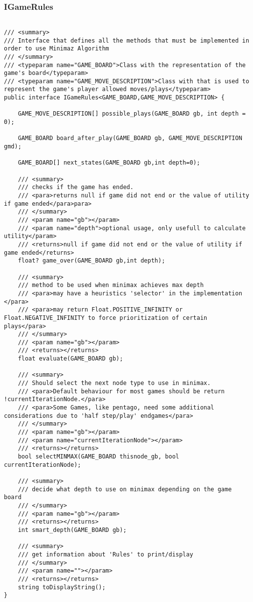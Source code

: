 \subsubsection{IGameRules}
\label{IGameRules}

\begin{lstlisting}

/// <summary>
/// Interface that defines all the methods that must be implemented in order to use Minimaz Algorithm
/// </summary>
/// <typeparam name="GAME_BOARD">Class with the representation of the game's board</typeparam>
/// <typeparam name="GAME_MOVE_DESCRIPTION">Class with that is used to represent the game's player allowed moves/plays</typeparam>
public interface IGameRules<GAME_BOARD,GAME_MOVE_DESCRIPTION> { 
	
	GAME_MOVE_DESCRIPTION[] possible_plays(GAME_BOARD gb, int depth = 0);
	
	GAME_BOARD board_after_play(GAME_BOARD gb, GAME_MOVE_DESCRIPTION gmd);

	GAME_BOARD[] next_states(GAME_BOARD gb,int depth=0);

    /// <summary>
    /// checks if the game has ended.
    /// <para>returns null if game did not end or the value of utility if game ended</para>para>
    /// </summary>
    /// <param name="gb"></param>
    /// <param name="depth">optional usage, only usefull to calculate utility</param>
    /// <returns>null if game did not end or the value of utility if game ended</returns>
    float? game_over(GAME_BOARD gb,int depth);

    /// <summary>
    /// method to be used when minimax achieves max depth
    /// <para>may have a heuristics 'selector' in the implementation </para>
    /// <para>may return Float.POSITIVE_INFINITY or Float.NEGATIVE_INFINITY to force prioritization of certain plays</para>
    /// </summary>
    /// <param name="gb"></param>
    /// <returns></returns>
    float evaluate(GAME_BOARD gb);

    /// <summary>
    /// Should select the next node type to use in minimax. 
    /// <para>Default behaviour for most games should be return !currentIterationNode.</para>
    /// <para>Some Games, like pentago, need some additional considerations due to 'half step/play' endgames</para>
    /// </summary>
    /// <param name="gb"></param>
    /// <param name="currentIterationNode"></param>
    /// <returns></returns>
    bool selectMINMAX(GAME_BOARD thisnode_gb, bool currentIterationNode);

    /// <summary>
    /// decide what depth to use on minimax depending on the game board
    /// </summary>
    /// <param name="gb"></param>
    /// <returns></returns>
    int smart_depth(GAME_BOARD gb);

    /// <summary>
    /// get information about 'Rules' to print/display
    /// </summary>
    /// <param name=""></param>
    /// <returns></returns>
    string toDisplayString();
}

\end{lstlisting}